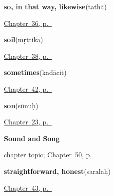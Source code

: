 \noindent\begin{minipage}[t]{\linewidth}
\raggedright
\textbf{so, in that way, likewise}\enspace\emph{}\enspace(tathā)\par
\footnotesize \hyperref[ch:sa-replies-more]{Chapter~36, p.~\pageref*{ch:sa-replies-more}}
\end{minipage}\par\smallskip

\noindent\begin{minipage}[t]{\linewidth}
\raggedright
\textbf{soil}\enspace\emph{}\enspace(mṛttikā)\par
\footnotesize \hyperref[ch:sa-fire-and-stone]{Chapter~38, p.~\pageref*{ch:sa-fire-and-stone}}
\end{minipage}\par\smallskip

\noindent\begin{minipage}[t]{\linewidth}
\raggedright
\textbf{sometimes}\enspace\emph{}\enspace(kadācit)\par
\footnotesize \hyperref[ch:sa-replies-third]{Chapter~42, p.~\pageref*{ch:sa-replies-third}}
\end{minipage}\par\smallskip

\noindent\begin{minipage}[t]{\linewidth}
\raggedright
\textbf{son}\enspace\emph{}\enspace(sūnuḥ)\par
\footnotesize \hyperref[ch:sa-kinship]{Chapter~23, p.~\pageref*{ch:sa-kinship}}
\end{minipage}\par\smallskip

\noindent\begin{minipage}[t]{\linewidth}
\raggedright
\textbf{Sound and Song}\par
\footnotesize chapter topic; \hyperref[ch:sa-sound-and-song]{Chapter~50, p.~\pageref*{ch:sa-sound-and-song}}
\end{minipage}\par\smallskip

\noindent\begin{minipage}[t]{\linewidth}
\raggedright
\textbf{straightforward, honest}\enspace\emph{}\enspace(saralaḥ)\par
\footnotesize \hyperref[ch:sa-good-manners]{Chapter~43, p.~\pageref*{ch:sa-good-manners}}
\end{minipage}\par\smallskip

